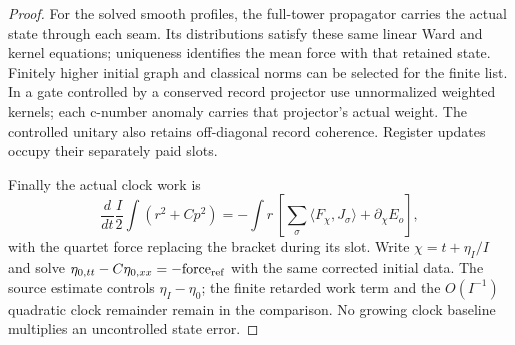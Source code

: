 \begin{proof}
For the solved smooth profiles, the full-tower propagator carries
the actual state through each seam. Its distributions satisfy these
same linear Ward and kernel equations; uniqueness identifies the
mean force with that retained state. Finitely higher initial graph
and classical norms can be selected for the finite list. In a gate
controlled by a conserved record projector use unnormalized weighted
kernels; each c-number anomaly carries that projector's actual
weight. The controlled unitary also retains off-diagonal record
coherence. Register updates occupy their separately paid slots.

Finally the actual clock work is
\[
 \frac d{dt}\frac I2\int(r^2+Cp^2)
 =-\int r\,[\sum_\sigma\langle F_\chi,J_\sigma\rangle
                         +\partial_\chi E_o],
\]
with the quartet force replacing the bracket during its slot.
Write $\chi=t+\eta_I/I$ and solve
$\eta_{0,tt}-C\eta_{0,xx}=-\mathrm{force}_{\rm ref}$
with the same corrected initial data. The source estimate controls
$\eta_I-\eta_0$; the finite retarded work term and the
$O(I^{-1})$ quadratic clock remainder remain in the comparison.
No growing clock baseline multiplies an uncontrolled state error.
\end{proof}

